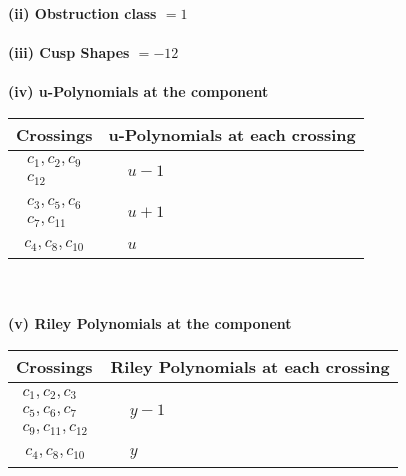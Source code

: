 \documentclass[1p]{elsarticle_modified}
\theoremstyle{definition}
\begin{document}
\flushleft \textbf{(ii) Obstruction class $= 1$}\\~\\
\flushleft \textbf{(iii) Cusp Shapes $= -12$}\\~\\
\newpage\renewcommand{\arraystretch}{1}
\flushleft \textbf{(iv) u-Polynomials at the component}\newline \\
\begin{tabular}{m{50pt}|m{274pt}}
Crossings & \hspace{64pt}u-Polynomials at each crossing \\
\hline $$\begin{aligned}c_{1},c_{2},c_{9}\\c_{12}\end{aligned}$$&$\begin{aligned}
&u-1
\end{aligned}$\\
\hline $$\begin{aligned}c_{3},c_{5},c_{6}\\c_{7},c_{11}\end{aligned}$$&$\begin{aligned}
&u+1
\end{aligned}$\\
\hline $$\begin{aligned}c_{4},c_{8},c_{10}\end{aligned}$$&$\begin{aligned}
&u
\end{aligned}$\\
\hline
\end{tabular}\\~\\
\newpage\renewcommand{\arraystretch}{1}
\flushleft \textbf{(v) Riley Polynomials at the component}\newline \\
\begin{tabular}{m{50pt}|m{274pt}}
Crossings & \hspace{64pt}Riley Polynomials at each crossing \\
\hline $$\begin{aligned}c_{1},c_{2},c_{3}\\c_{5},c_{6},c_{7}\\c_{9},c_{11},c_{12}\end{aligned}$$&$\begin{aligned}
&y-1
\end{aligned}$\\
\hline $$\begin{aligned}c_{4},c_{8},c_{10}\end{aligned}$$&$\begin{aligned}
&y
\end{aligned}$\\
\hline
\end{tabular}\\~\\
\end{document}
